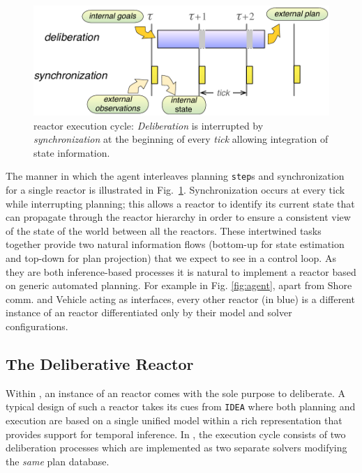 \begin{figure}[!htbp]
  \centering
  \vskip-1pc
  \includegraphics[width=0.55\columnwidth]{figs/tick-cycle}
  \caption{\small \rx reactor execution cycle: {\em Deliberation} is
    interrupted by {\em synchronization} at the beginning of every
    {\em tick} allowing integration of state information.}
  \label{fig:tick-exec}
  \vskip-0.8pc
\end{figure}

The manner in which the agent interleaves planning \texttt{step}s and
synchronization for a single reactor is illustrated in
Fig.~\ref{fig:tick-exec}. Synchronization occurs at every tick while
interrupting planning; this allows a reactor to identify its current
state that can propagate through the reactor hierarchy in order to
ensure a consistent view of the state of the world between all the
reactors.
These intertwined tasks together provide two natural information flows
(bottom-up for state estimation and top-down for plan projection) that
we expect to see in a control loop. As they are both inference-based
processes it is natural to implement a reactor based on generic
automated planning. For example in Fig. \ref{fig:agent}, apart from
\textsf{Shore comm.} and \textsf{Vehicle} acting as interfaces, every
other reactor (in blue) is a different instance of an \eu reactor
differentiated only by their model and \eu solver configurations.

\subsection{The  \eu Deliberative Reactor}
\label{sec:arch:europa}

Within \rx, an instance of an \eu reactor comes with the sole purpose
to deliberate. A typical design of such a reactor takes its cues from
\texttt{IDEA} \cite{mus02, mus06} where both planning and execution
are based on a single unified model within a rich representation that
provides support for temporal inference. In \rx, the execution cycle
consists of two deliberation processes which are implemented as two
separate \eu solvers modifying the \emph{same} plan database.

